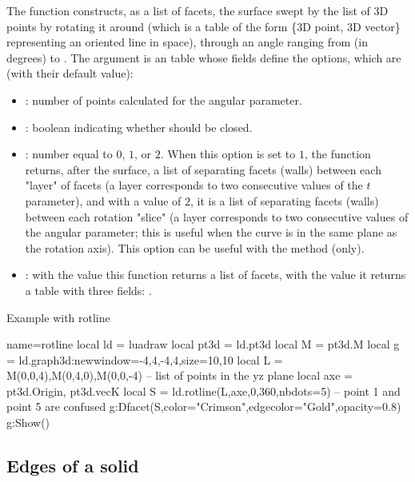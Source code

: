 The function  constructs, as a list of facets, the surface swept by the list of 3D points  by rotating it around  (which is a table of the form \{3D point, 3D vector\} representing an oriented line in space), through an angle ranging from  (in degrees) to . The argument  is an table whose fields define the options, which are (with their default value):
\begin{itemize}
    \item {}: number of points calculated for the angular parameter.

    \item {}: boolean indicating whether  should be closed.

    \item {}: number equal to $0$, $1$, or $2$. When this option is set to $1$, the function returns, after the surface, a list of separating facets (walls) between each "layer" of facets (a layer corresponds to two consecutive values ​​of the $t$ parameter), and with a value of $2$, it is a list of separating facets (walls) between each rotation "slice" (a layer corresponds to two consecutive values ​​of the angular parameter; this is useful when the curve is in the same plane as the rotation axis). This option can be useful with the  method (only).
    
   \item {} : with the value \false this function returns a list of facets, with the value \true it returns a table with three fields: .     
\end{itemize}

\begin{demo}{Example with rotline}
\begin{luadraw}{name=rotline}
local ld = luadraw
local pt3d = ld.pt3d
local M = pt3d.M
local g = ld.graph3d:new{window={-4,4,-4,4},size={10,10}}
local L = {M(0,0,4),M(0,4,0),M(0,0,-4)} -- list of points in the yz plane
local axe = {pt3d.Origin, pt3d.vecK}
local S = ld.rotline(L,axe,0,360,{nbdots=5}) -- point 1 and point 5 are confused
g:Dfacet(S,{color="Crimson",edgecolor="Gold",opacity=0.8})
g:Show()
\end{luadraw}
\end{demo}      


\subsection{Edges of a solid}

